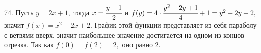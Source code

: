 74. Пусть $y=2x+1,$ тогда $x=\cfrac{y-1}{2}$ и $f(y)=4\cdot\cfrac{y^2-2y+1}{4}+1=y^2-2y+2,$ значит $f(x)=x^2-2x+2.$ График этой функции представляет из себя параболу с ветвями вверх, значит наибольшее значение достигается на одном из концов отрезка. Так как $f(0)=f(2)=2,$ оно равно 2.\\
